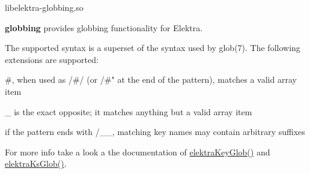\begin{DoxyCode}
libelektra-globbing.so
\end{DoxyCode}


{\bfseries globbing} provides globbing functionality for Elektra.

The supported syntax is a superset of the syntax used by {\ttfamily glob(7)}. The following extensions are supported\+:


\begin{DoxyItemize}
\item {\ttfamily \#}, when used as {\ttfamily /\#/} (or {\ttfamily /\#"} at the end of the pattern), matches a valid array item
\item {\ttfamily \+\_\+} is the exact opposite; it matches anything but a valid array item
\item if the pattern ends with {\ttfamily /\+\_\+\+\_\+}, matching key names may contain arbitrary suffixes
\end{DoxyItemize}

For more info take a look a the documentation of {\ttfamily \hyperlink{globbing_8c_ad7700821df72fc0fc3bfc336e4368d29}{elektra\+Key\+Glob()}} and {\ttfamily \hyperlink{globbing_8c_a85baa9c79325ad1bf08e95cd82a4daf6}{elektra\+Ks\+Glob()}}. 